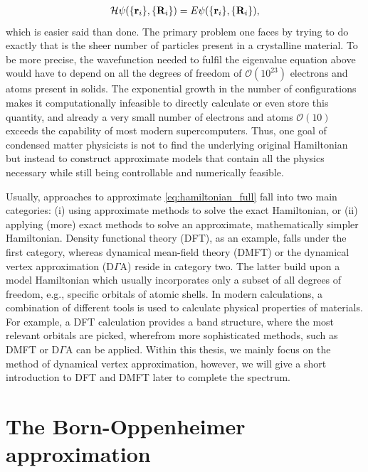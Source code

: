 \documentclass[\main/main.tex]{subfiles}
\begin{document}
\begin{align}
	\mathcal{H}\psi(\{\textbf{r}_i\},\{\textbf{R}_i\})=E\psi(\{\textbf{r}_i\},\{\textbf{R}_i\}),
\end{align}
which is easier said than done. The primary problem one faces by trying to do exactly that is the sheer number of particles present in a crystalline material. To be more precise, the wavefunction needed to fulfil the eigenvalue equation above would have to depend on all the degrees of freedom of $\mathcal{O}(10^{23})$ electrons and atoms present in solids. The exponential growth in the number of configurations makes it computationally infeasible to directly calculate or even store this quantity, and already a very small number of electrons and atoms $\mathcal{O}(10)$ exceeds the capability of most modern supercomputers. Thus, one goal of condensed matter physicists is not to find the underlying original Hamiltonian but instead to construct approximate models that contain all the physics necessary while still being controllable and numerically feasible.

Usually, approaches to approximate \eqref{eq:hamiltonian_full} fall into two main categories: (i) using approximate methods to solve the exact Hamiltonian, or (ii) applying (more) exact methods to solve an approximate, mathematically simpler Hamiltonian. Density functional theory (DFT), as an example, falls under the first category, whereas dynamical mean-field theory (DMFT) or the dynamical vertex approximation ($\text{D}\Gamma\text{A}$) reside in category two. The latter build upon a model Hamiltonian which usually incorporates only a subset of all degrees of freedom, e.g., specific orbitals of atomic shells. In modern calculations, a combination of different tools is used to calculate physical properties of materials. For example, a DFT calculation provides a band structure, where the most relevant orbitals are picked, wherefrom more sophisticated methods, such as DMFT or $\text{D}\Gamma\text{A}$ can be applied. Within this thesis, we mainly focus on the method of dynamical vertex approximation, however, we will give a short introduction to DFT and DMFT later to complete the spectrum. 

\section{The Born-Oppenheimer approximation}
\end{document}
